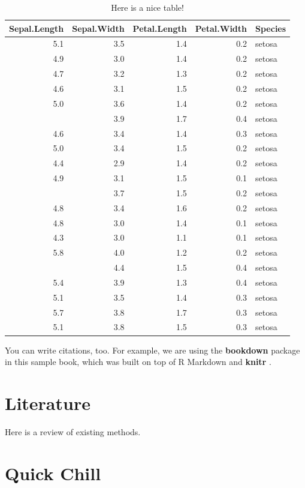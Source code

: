 \documentclass[
]{book}
\begin{document}
\begin{table}

\caption{\label{tab:nice-tab}Here is a nice table!}
\centering
\begin{tabular}[t]{rrrrl}
\toprule
Sepal.Length & Sepal.Width & Petal.Length & Petal.Width & Species\\
\midrule
5.1 & 3.5 & 1.4 & 0.2 & setosa\\
4.9 & 3.0 & 1.4 & 0.2 & setosa\\
4.7 & 3.2 & 1.3 & 0.2 & setosa\\
4.6 & 3.1 & 1.5 & 0.2 & setosa\\
5.0 & 3.6 & 1.4 & 0.2 & setosa\\
\addlinespace
5.4 & 3.9 & 1.7 & 0.4 & setosa\\
4.6 & 3.4 & 1.4 & 0.3 & setosa\\
5.0 & 3.4 & 1.5 & 0.2 & setosa\\
4.4 & 2.9 & 1.4 & 0.2 & setosa\\
4.9 & 3.1 & 1.5 & 0.1 & setosa\\
\addlinespace
5.4 & 3.7 & 1.5 & 0.2 & setosa\\
4.8 & 3.4 & 1.6 & 0.2 & setosa\\
4.8 & 3.0 & 1.4 & 0.1 & setosa\\
4.3 & 3.0 & 1.1 & 0.1 & setosa\\
5.8 & 4.0 & 1.2 & 0.2 & setosa\\
\addlinespace
5.7 & 4.4 & 1.5 & 0.4 & setosa\\
5.4 & 3.9 & 1.3 & 0.4 & setosa\\
5.1 & 3.5 & 1.4 & 0.3 & setosa\\
5.7 & 3.8 & 1.7 & 0.3 & setosa\\
5.1 & 3.8 & 1.5 & 0.3 & setosa\\
\bottomrule
\end{tabular}
\end{table}

You can write citations, too. For example, we are using the \textbf{bookdown} package \citep{R-bookdown} in this sample book, which was built on top of R Markdown and \textbf{knitr} \citep{xie2015}.

\hypertarget{literature}{%
\chapter{Literature}\label{literature}}

Here is a review of existing methods.

\hypertarget{quick-chill}{%
\chapter{Quick Chill}\label{quick-chill}}
\end{document}
